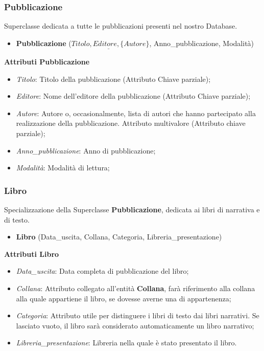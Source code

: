 \documentclass[a4paper, 15pt, oneside]{article}
\begin{document}
	\subsubsection{Pubblicazione}
	Superclasse dedicata a tutte le pubblicazioni presenti nel nostro Database.
	\begin{itemize}
		\item \textbf{Pubblicazione} ($\underline{Titolo, Editore, \{Autore}\}$, Anno\_pubblicazione, Modalità)
	\end{itemize}
	\textbf{Attributi Pubblicazione}
	\begin{itemize}
		\item \textit{Titolo}: Titolo della pubblicazione (Attributo Chiave parziale);
		\item \textit{Editore}: Nome dell'editore della pubblicazione (Attributo Chiave parziale);
		\item \textit{Autore}: Autore o, occasionalmente, lista di autori che hanno partecipato alla realizzazione della pubblicazione. Attributo multivalore (Attributo chiave parziale);
		\item \textit{Anno\_pubblicazione}: Anno di pubblicazione;
		\item \textit{Modalità}: Modalità di lettura;
	\end{itemize}
	\subsubsection{Libro}
	Specializzazione della Superclasse \textbf{Pubblicazione}, dedicata ai libri di narrativa e di testo.
	\begin{itemize}
		\item \textbf{Libro} (Data\_uscita, Collana, Categoria, Libreria\_presentazione)
	\end{itemize}
	\textbf{Attributi Libro}
	\begin{itemize}
		\item \textit{Data\_uscita}: Data completa di pubblicazione del libro;
		\item \textit{Collana}: Attributo collegato all'entità \textbf{Collana}, farà riferimento alla collana alla quale appartiene il libro, se dovesse averne una di appartenenza;
		\item \textit{Categoria}: Attributo utile per distinguere i libri di testo dai libri narrativi. Se lasciato vuoto, il libro sarà considerato automaticamente un libro narrativo;
		\item \textit{Libreria\_presentazione}: Libreria nella quale è stato presentato il libro.
	\end{itemize}
\end{document}
